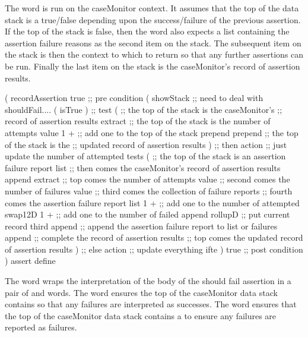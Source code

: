 
The  word is run on the caseMonitor context. It 
assumes that the top of the data stack is a true/false depending upon the 
success/failure of the previous assertion. If the top of the stack is 
false, then the  word also expects a list containing 
the assertion failure reasons as the second item on the stack. The 
subsequent item on the stack is then the context to which to return so 
that any further assertions can be run. Finally the last item on the stack 
is the caseMonitor's record of assertion results. 

\startJoylolCode
(
  recordAssertion
  { true }    ;; pre condition
  (
    showStack ;; need to deal with shouldFail....
    (
      isTrue
    )  ;; test
    (
      ;; the top of the stack is the caseMonitor's
      ;; record of assertion results
      extract
      ;; the top of the stack is the number of attempts value
      1 + ;; add one to the top of the stack
      prepend
      prepend
      ;; the top of the stack is the
      ;; updated record of assertion results
    )  ;; then action ;; just update the number of attempted tests 
    (
      ;; the top of the stack is an assertion failure report list
      ;; then comes the caseMonitor's record of assertion results
      append
      extract
      ;; top    comes the number of attempts value
      ;; second comes the number of failures value
      ;; third  comes the collection of failure reports
      ;; fourth comes the assertion failure report list
      1 + ;; add one to the number of attempted
      swap12D
      1 + ;; add one to the number of failed
      append
      rollupD ;; put current record third
      append  ;; append the assertion failure report to list or failures
      append  ;; complete the record of assertion results
      ;; top comes the updated record of assertion results
    )  ;; else action ;; update everything
    ifte
  )
  { true }   ;; post condition
)
assert
define
\stopJoylolCode
\stopTestSuite

\startTestSuite[assertShouldFail]

The  word wraps the interpretation of the body of 
the should fail assertion in a pair of  and 
 words. The  word ensures 
the top of the caseMonitor data stack contains  so that any 
failures are interpreted as successes. The  word 
ensures that the top of the caseMonitor data stack contains a  
to ensure any failures are reported as failures. 

